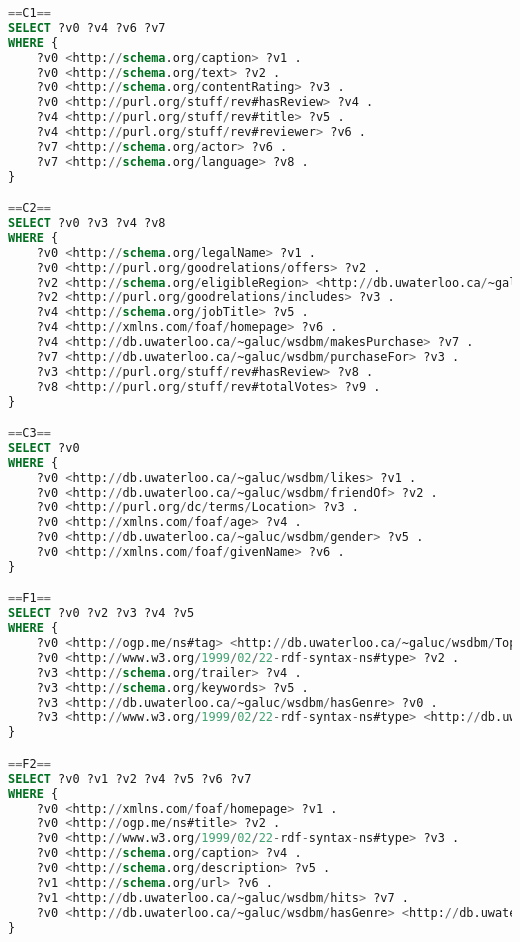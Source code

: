 \begin{lstlisting}[language=SQL, basicstyle=\ttfamily\scriptsize,morekeywords={PREFIX,OPTIONAL,FILTER,java,rdf,rdfs,url},label=watdiv-sparql-queries,basewidth=0.5em]
==C1==
SELECT ?v0 ?v4 ?v6 ?v7 
WHERE {
    ?v0 <http://schema.org/caption> ?v1 .
    ?v0 <http://schema.org/text> ?v2 .
    ?v0 <http://schema.org/contentRating> ?v3 .
    ?v0 <http://purl.org/stuff/rev#hasReview> ?v4 .
    ?v4 <http://purl.org/stuff/rev#title> ?v5 .
    ?v4 <http://purl.org/stuff/rev#reviewer> ?v6 .
    ?v7 <http://schema.org/actor> ?v6 .
    ?v7 <http://schema.org/language> ?v8 .
}

==C2==
SELECT ?v0 ?v3 ?v4 ?v8 
WHERE {
    ?v0 <http://schema.org/legalName> ?v1 .
    ?v0 <http://purl.org/goodrelations/offers> ?v2 .
    ?v2 <http://schema.org/eligibleRegion> <http://db.uwaterloo.ca/~galuc/wsdbm/Country5> .
    ?v2 <http://purl.org/goodrelations/includes> ?v3 .
    ?v4 <http://schema.org/jobTitle> ?v5 .
    ?v4 <http://xmlns.com/foaf/homepage> ?v6 .
    ?v4 <http://db.uwaterloo.ca/~galuc/wsdbm/makesPurchase> ?v7 .
    ?v7 <http://db.uwaterloo.ca/~galuc/wsdbm/purchaseFor> ?v3 .
    ?v3 <http://purl.org/stuff/rev#hasReview> ?v8 .
    ?v8 <http://purl.org/stuff/rev#totalVotes> ?v9 .
}

==C3==
SELECT ?v0 
WHERE {
    ?v0 <http://db.uwaterloo.ca/~galuc/wsdbm/likes> ?v1 .
    ?v0 <http://db.uwaterloo.ca/~galuc/wsdbm/friendOf> ?v2 .
    ?v0 <http://purl.org/dc/terms/Location> ?v3 .
    ?v0 <http://xmlns.com/foaf/age> ?v4 .
    ?v0 <http://db.uwaterloo.ca/~galuc/wsdbm/gender> ?v5 .
    ?v0 <http://xmlns.com/foaf/givenName> ?v6 .
}

==F1==
SELECT ?v0 ?v2 ?v3 ?v4 ?v5 
WHERE {
    ?v0 <http://ogp.me/ns#tag> <http://db.uwaterloo.ca/~galuc/wsdbm/Topic13> .
    ?v0 <http://www.w3.org/1999/02/22-rdf-syntax-ns#type> ?v2 .
    ?v3 <http://schema.org/trailer> ?v4 .
    ?v3 <http://schema.org/keywords> ?v5 .
    ?v3 <http://db.uwaterloo.ca/~galuc/wsdbm/hasGenre> ?v0 .
    ?v3 <http://www.w3.org/1999/02/22-rdf-syntax-ns#type> <http://db.uwaterloo.ca/~galuc/wsdbm/ProductCategory2> .
}

==F2==
SELECT ?v0 ?v1 ?v2 ?v4 ?v5 ?v6 ?v7 
WHERE {
    ?v0 <http://xmlns.com/foaf/homepage> ?v1 .
    ?v0 <http://ogp.me/ns#title> ?v2 .
    ?v0 <http://www.w3.org/1999/02/22-rdf-syntax-ns#type> ?v3 .
    ?v0 <http://schema.org/caption> ?v4 .
    ?v0 <http://schema.org/description> ?v5 .
    ?v1 <http://schema.org/url> ?v6 .
    ?v1 <http://db.uwaterloo.ca/~galuc/wsdbm/hits> ?v7 .
    ?v0 <http://db.uwaterloo.ca/~galuc/wsdbm/hasGenre> <http://db.uwaterloo.ca/~galuc/wsdbm/SubGenre22> .
}


\end{lstlisting}
